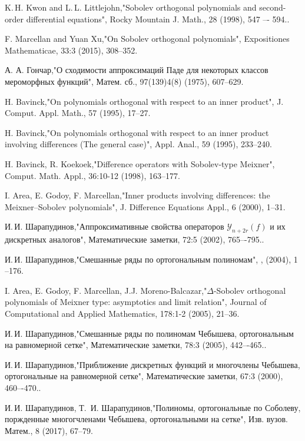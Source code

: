 \begin{thebibliography}{99}
K.\,H. Kwon and L.\,L. Littlejohn,"Sobolev orthogonal polynomials and second-order differential equations", Rocky Mountain J. Math., 28 (1998), 547 –- 594..


F. Marcellan and Yuan Xu,"On Sobolev orthogonal polynomials", Expositiones Mathematicae, 33:3 (2015), 308--352.


А. А. Гончар,"О сходимости аппроксимаций Паде для некоторых классов мероморфных функций", Матем. сб., 97(139)4(8) (1975), 607–629.


H. Bavinck,"On polynomials orthogonal with respect to an inner product", J. Comput. Appl. Math., 57 (1995), 17--27.


H. Bavinck,"On polynomials orthogonal with respect to an inner product involving differences (The general case)", Appl. Anal., 59 (1995), 233--240.


H. Bavinck, R. Koekoek,"Difference operators with Sobolev-type Meixner", Comput. Math. Appl., 36:10-12 (1998), 163--177.


I. Area, E. Godoy, F. Marcellan,"Inner products involving differences: the Meixner--Sobolev polynomials", J. Difference Equations Appl., 6 (2000), 1--31.


И.\,И. Шарапудинов,"Аппроксимативные свойства операторов $\mathcal{Y}_{n+2r}(f)$ и их дискретных аналогов", Математические заметки, 72:5 (2002), 765–-795..


И.\,И. Шарапудинов,"Смешанные ряды по ортогональным полиномам", ,  (2004), 1 --176.


I. Area, E. Godoy, F. Marcellan, J.J. Moreno-Balcazar,"$\Delta$-Sobolev orthogonal polynomials of Meixner type: asymptotics and limit relation", Journal of Computational and Applied Mathematics, 178:1-2 (2005), 21--36.


И.\,И. Шарапудинов,"Смешанные ряды по полиномам Чебышева, ортогональным на равномерной сетке", Математические заметки, 78:3 (2005), 442–-465..


И.\,И. Шарапудинов,"Приближение дискретных функций и многочлены Чебышева, ортогональные на равномерной сетке", Математические заметки, 67:3 (2000), 460–-470..


И.\,И. Шарапудинов, Т.\, И. Шарапудинов,"Полиномы, ортогональные по Соболеву, поржденные многогчленами Чебышева, ортогональными на сетке", Изв. вузов. Матем., 8 (2017), 67--79.



\end{thebibliography}
